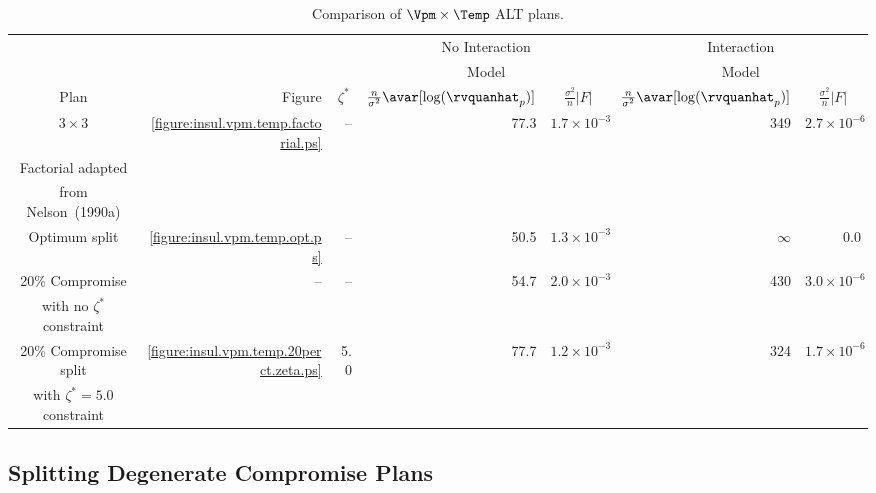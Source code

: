 \begin{table}
\caption{Comparison of $\Vpm \times \Temp$ ALT plans.}
\centering\small
\begin{tabular}{crrrrrr}
\\[-.5ex]
\hline
&&&\multicolumn{2}{c}{No Interaction}&
\multicolumn{2}{c}{Interaction} \\
&&&\multicolumn{2}{c}{Model}&
\multicolumn{2}{c}{Model} \\
\cline{4-5} \cline{6-7}
\multicolumn{1}{c}{\rule{0ex}{3ex} Plan} &Figure&\multicolumn{1}{c}{$\zeta^{*}$}&
\multicolumn{1}{c}{$\frac{n}{\sigma^{2}}\avar[\log(\rvquanhat_{p})]$} &
\multicolumn{1}{c}{$\frac{\sigma^{2}}{n}|F|$} &
\multicolumn{1}{c}{$\frac{n}{\sigma^{2}}\avar[\log(\rvquanhat_{p})]$} &
\multicolumn{1}{c}{$\frac{\sigma^{2}}{n}|F|$} \\[.7ex]
\hline
\rule{0mm}{4ex}
$ 3 \times 3$ &\ref{figure:insul.vpm.temp.factorial.ps}&--& 77.3 & $1.7 \times 10^{-3}$ & 349 & $2.7 \times 10^{-6}$ \\
Factorial adapted\\
from Nelson~(1990a)\\
\hline
\rule{0mm}{4ex}
Optimum split&\ref{figure:insul.vpm.temp.opt.ps}&--&50.5 & $1.3 \times 10^{-3}$ & $\infty$ & 0.0 \\
[2ex]   \hline
\rule{0mm}{4ex}
20\% Compromise &--& --& 54.7 &$2.0 \times 10^{-3}$  & 430 & $3.0 \times 10^{-6}$ \\
with no $\zeta^{*}$ constraint\\
[2ex]   \hline
\rule{0mm}{4ex}
20\% Compromise split&\ref{figure:insul.vpm.temp.20perct.zeta.ps}&
      5.0& 77.7 &$1.2 \times 10^{-3}$ & 324 &$1.7 \times 10^{-6}$ \\
with $\zeta^{*}=5.0$ constraint\\
 \hline
\end{tabular}
\begin{minipage}[t]{4in}
\end{minipage}
\label{table:alt.vpm.temp.comp.plan}
\end{table}

\subsection{Splitting Degenerate Compromise Plans}

